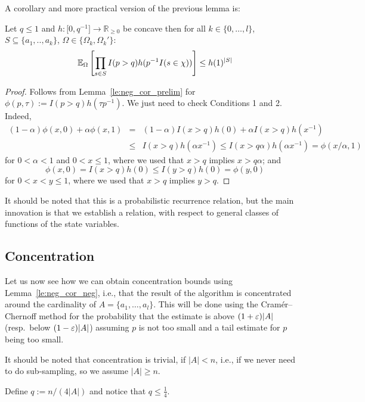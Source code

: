 A corollary and more practical version of the previous lemma is:
\begin{lemma}\label{le:neg_cor_neg}
Let $q \leq 1$ and $h : \mathbb [0,q^{-1}] \rightarrow \mathbb R_{\geq 0}$ be concave then for all 
$k \in \{0,\ldots,l\}$, $S \subseteq \{a_1,..,a_k\}$, $\Omega \in \{\Omega_k,\Omega_k'\}$:
\[
  \operatorname{\mathbb E}_{\Omega}\left[ \prod_{s \in S} I(p>q) h(p^{-1} I(s \in \chi)) \right] \leq h(1)^{|S|} 
\]
\end{lemma}
\begin{proof}
Follows from Lemma~\ref{le:neg_cor_prelim} for $\phi(p,\tau) := I(p > q) h(\tau p^{-1})$. We just
need to check Conditions 1 and 2. Indeed,
\begin{eqnarray*}
  (1-\alpha) \phi(x,0) + \alpha \phi(x,1) & = & (1-\alpha) I(x>q) h(0) + \alpha I(x>q) h(x^{-1}) \\
   & \leq & I(x > q) h(\alpha x^{-1}) \leq I(x > q \alpha) h(\alpha x^{-1}) = \phi(x/\alpha,1)
\end{eqnarray*}
for $0 < \alpha < 1$ and $0< x \leq 1$, where we used that $x > q$ implies $x > q \alpha$; and
\[
  \phi(x,0) = I(x>q) h(0) \leq I(y > q) h(0) = \phi(y,0)
\]
for $0 < x < y \leq 1$, where we used that $x > q$ implies $y > q$.
\end{proof}

It should be noted that this is a probabilistic recurrence relation, but the main innovation is that
we establish a relation, with respect to general classes of functions of the state variables.

\subsection{Concentration}
Let us now see how we can obtain concentration bounds using Lemma~\ref{le:neg_cor_neg}, i.e., that
the result of the algorithm is concentrated around the cardinality of $A = \{ a_1, \ldots, a_l \}$.
This will be done using the Cram\'{e}r--Chernoff method for the probability that the estimate is 
above $(1+\varepsilon)|A|$ (resp.~below $(1-\varepsilon)|A|$) assuming $p$ is not too small and a tail estimate 
for $p$ being too small.

It should be noted that concentration is trivial, if $|A| < n$, i.e., if we never need to do
sub-sampling, so we assume $|A| \geq n$.

Define $q := n/(4|A|)$ and notice that $q \leq \frac{1}{4}$.

